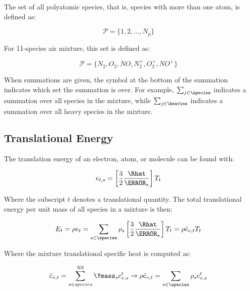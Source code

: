 \documentclass[10pt]{article}
\begin{document}
\begin{flushleft}
\begin{definition}
    \label{def:poly-set}
    The set of all polyatomic species, that is, species with more than one atom, is defined as:

    \begin{equation}
        \mathcal{P} = \{ 1, 2, \dots, N_p \}
    \end{equation}

    For 11-species air mixture, this set is defined as:

    \begin{equation*}
        \mathcal{P} = \{ N_2, O_2, NO, N_2^+, O_2^+, NO^+\}
    \end{equation*}
\end{definition}

When summations are given, the symbol at the bottom of the summation indicates which set the summation is over. For example, $\sum_{j \in \species}$ indicates a summation over all species in the mixture, while $\sum_{j \in \heavies}$ indicates a summation over all heavy species in the mixture.

\subsection{Translational Energy}

The translation energy of an electron, atom, or molecule can be found with:

\begin{equation*}
    e_{t,s} = \bb{\frac{3}{2} \frac{\Rhat}{\MW_s}} T_t
\end{equation*}

Where the subscript $t$ denotes a translational quantity. The total translational energy per unit mass of all species in a mixture is then:

\begin{equation}
    E_t = \rho e_t = \sum_{s \in \species} \rho_s \bb{\frac{3}{2} \frac{\Rhat}{\MW_s}} T_t = \rho \bar{c}_{v,t} T_t
    \label{eq:trans-energy}
\end{equation}

Where the mixture translational specific heat is computed as:

\begin{equation*}
    \bar{c}_{v,t} = \sum_{s \in species}^\text{NS} \Ymass_s c_{v,s}^{t} \rightarrow \rho \bar{c}_{v,t} = \sum_{s \in \species} \rho_s c_{v,s}^{t}
    \label{eq:cvtbar}
\end{equation*}


\end{flushleft}
\end{document}
